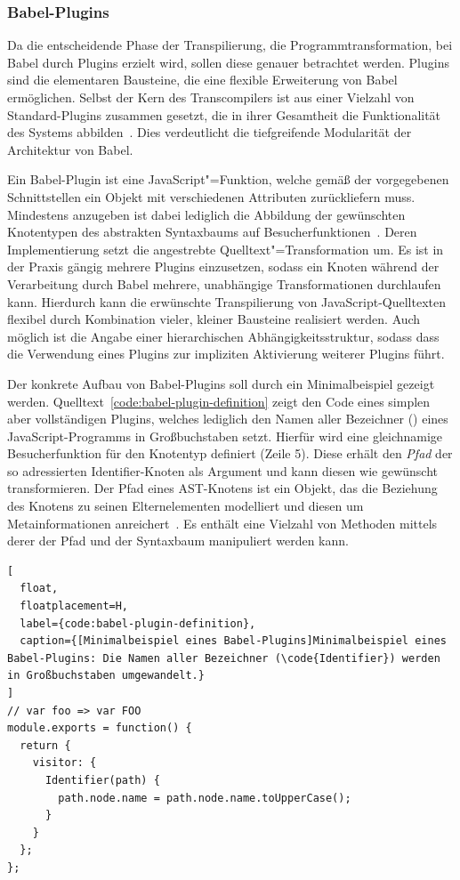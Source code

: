 \subsubsection{Babel-Plugins}
\label{sec:babel-plugins}

Da die entscheidende Phase der Transpilierung, die Programmtransformation, bei Babel durch Plugins erzielt wird, sollen diese genauer betrachtet werden. Plugins sind die elementaren Bausteine, die eine flexible Erweiterung von Babel ermöglichen. Selbst der Kern des Transcompilers ist aus einer Vielzahl von Standard-Plugins zusammen gesetzt, die in ihrer Gesamtheit die Funktionalität des Systems abbilden~\autocite{BABEL}. Dies verdeutlicht die tiefgreifende Modularität der Architektur von Babel.

Ein Babel-Plugin ist eine JavaScript"=Funktion, welche gemäß der vorgegebenen Schnittstellen ein Objekt mit verschiedenen Attributen zurückliefern muss. Mindestens anzugeben ist dabei lediglich die Abbildung der gewünschten Knotentypen des abstrakten Syntaxbaums auf Besucherfunktionen~\autocite{BABEL:HANDBOOK}. Deren Implementierung setzt die angestrebte Quelltext"=Transformation um. Es ist in der Praxis gängig mehrere Plugins einzusetzen, sodass ein Knoten während der Verarbeitung durch Babel mehrere, unabhängige Transformationen durchlaufen kann. Hierdurch kann die erwünschte Transpilierung von JavaScript-Quelltexten flexibel durch Kombination vieler, kleiner Bausteine realisiert werden. Auch möglich ist die Angabe einer hierarchischen Abhängigkeitsstruktur, sodass dass die Verwendung eines Plugins zur impliziten Aktivierung weiterer Plugins führt.

Der konkrete Aufbau von Babel-Plugins soll durch ein Minimalbeispiel gezeigt werden. Quelltext~\ref{code:babel-plugin-definition} zeigt den Code eines simplen aber vollständigen Plugins, welches lediglich den Namen aller Bezeichner () eines JavaScript-Programms in Großbuchstaben setzt. Hierfür wird eine gleichnamige Besucherfunktion für den Knotentyp  definiert (Zeile 5). Diese erhält den \emph{Pfad} der so adressierten Identifier-Knoten als Argument und kann diesen wie gewünscht transformieren. Der Pfad eines AST-Knotens ist ein Objekt, das die Beziehung des Knotens zu seinen Elternelementen modelliert und diesen um Metainformationen anreichert~\autocite{BABEL:HANDBOOK}. Es enthält eine Vielzahl von Methoden mittels derer der Pfad und der Syntaxbaum manipuliert werden kann.

\begin{lstlisting}[
  float,
  floatplacement=H,
  label={code:babel-plugin-definition},
  caption={[Minimalbeispiel eines Babel-Plugins]Minimalbeispiel eines Babel-Plugins: Die Namen aller Bezeichner (\code{Identifier}) werden in Großbuchstaben umgewandelt.}
]
// var foo => var FOO
module.exports = function() {
  return {
    visitor: {
      Identifier(path) {
        path.node.name = path.node.name.toUpperCase();
      }
    }
  };
};
\end{lstlisting}

